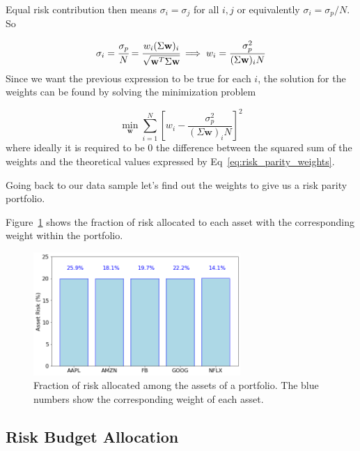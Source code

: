Equal risk contribution then means \(\sigma _{i} =\sigma _{j}\) for all \(i,j\) or equivalently \(\sigma _{i}=\sigma_p/N\). So

\begin{equation}
\sigma _{i} = \cfrac{\sigma_p}{N}={\cfrac {w_{i}(\Sigma \mathbf{w})_{i}}{\sqrt {\mathbf{w}^T\Sigma \mathbf{w}}}}\implies w_{i} = \frac {\sigma_p^{2}}{(\Sigma \mathbf{w})_{i}N}
\label{eq:risk_parity_weights}
\end{equation}
Since we want the previous expression to be true for each $i$, the solution for the weights can be found by solving the minimization problem

\begin{equation} 
\underset{\mathbf{w}}{\min } \sum _{i=1}^{N}\left[w_{i}-{\frac {\sigma_p^{2}}{(\Sigma \mathbf{w})_{i}N}}\right]^{2} 
\end{equation}
\noindent
where ideally it is required to be 0 the difference between the squared sum of the weights and the theoretical values expressed by Eq~\ref{eq:risk_parity_weights}.

Going back to our data sample let's find out the weights to give us a risk parity portfolio.


Figure~\ref{fig:risk_parity} shows the fraction of risk allocated to each asset with the corresponding weight within the portfolio.

\begin{figure}[htb]
\centering
\includegraphics[width=0.7\textwidth]{figures/risk_parity}
\caption{Fraction of risk allocated among the assets of a portfolio. The blue numbers show the corresponding weight of each asset.}
\label{fig:risk_parity}
\end{figure}

\subsection{Risk Budget Allocation}
\label{risk-budget-allocation}

